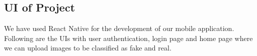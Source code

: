 



\newpage
\subsection{UI of Project}
We have used React Native for the development of our mobile application.
Following are the UIs with user authentication, login page and home page where we can upload images to be classified as fake and real.\\


